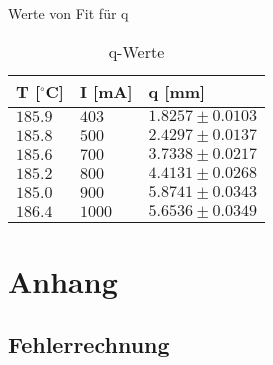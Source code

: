 \documentclass[12pt,a4paper]{article} %
\begin{document}
Werte von Fit für q
\begin{table}[h] \begin{center}
		\begin{tabular}{|lll|} \hline
			T [$^{\circ}$C] & I [mA] & q [mm]\\ \hline
			$185.9$ & $403$ & $1.8257 \pm 0.0103$\\
			$185.8$ & $500$ & $2.4297 \pm 0.0137$ \\
			$185.6$ & $700$ & $3.7338 \pm 0.0217$ \\
			$185.2$ & $800$ & $4.4131 \pm 0.0268$\\
			$185.0$ & $900$ & $5.8741 \pm 0.0343$\\
			$186.4$ & $1000$ & $5.6536 \pm 0.0349$ \\ \hline
	\end{tabular} \end{center}
\caption{q-Werte}
\end{table}




\newpage
\section{Anhang}

\newpage
\subsection{Fehlerrechnung}




\end{document}
